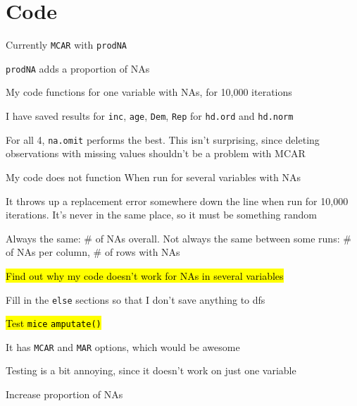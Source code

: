 \section*{Code}
	\begin{coi}
		\item Currently \texttt{MCAR} with \texttt{prodNA}
			\begin{coi}
				\item \texttt{prodNA} adds a proportion of NAs
				\item My code functions for one variable with NAs, for 10,000 iterations
					\begin{coi}
						\item I have saved results for \texttt{inc}, \texttt{age}, \texttt{Dem}, \texttt{Rep} for \texttt{hd.ord} and \texttt{hd.norm}
						\item For all 4, \texttt{na.omit} performs the best. This isn't surprising, since deleting observations with missing values shouldn't be a problem with MCAR
					\end{coi}
				\item My code does not function When run for several variables with NAs
					\begin{coi}
						\item It throws up a replacement error somewhere down the line when run for 10,000 iterations. It's never in the same place, so it must be something random
					\end{coi}
				\item Always the same: \# of NAs overall. Not always the same between some runs: \# of NAs per column, \# of rows with NAs
				\item \hl{Find out why my code doesn't work for NAs in several variables}
					\begin{coi}
						\item Fill in the \texttt{else{}} sections so that I don't save anything to dfs
					\end{coi}
			\end{coi}
		\item \hl{Test \texttt{mice} \texttt{amputate()}}
			\begin{coi}
				\item It has \texttt{MCAR} and \texttt{MAR} options, which would be awesome
				\item Testing is a bit annoying, since it doesn't work on just one variable
			\end{coi}
		\item Increase proportion of NAs
	\end{coi}

